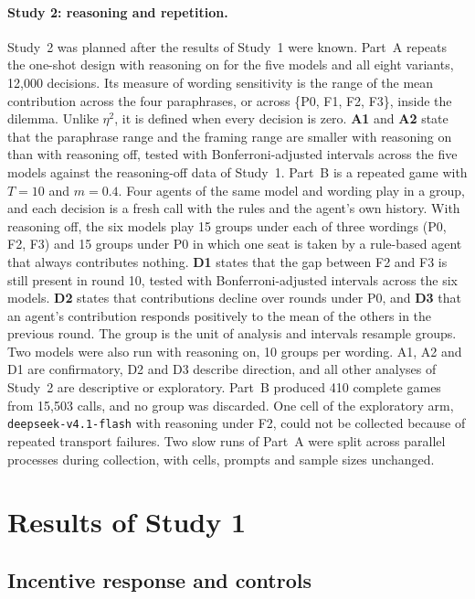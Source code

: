\documentclass[runningheads]{llncs}
\begin{document}
\paragraph{Study 2: reasoning and repetition.} Study~2 was planned after the results of Study~1 were known. Part~A repeats the one-shot design with reasoning on for the five models and all eight variants, 12,000 decisions. Its measure of wording sensitivity is the range of the mean contribution across the four paraphrases, or across \{P0, F1, F2, F3\}, inside the dilemma. Unlike $\eta^2$, it is defined when every decision is zero. \textbf{A1} and \textbf{A2} state that the paraphrase range and the framing range are smaller with reasoning on than with reasoning off, tested with Bonferroni-adjusted intervals across the five models against the reasoning-off data of Study~1. Part~B is a repeated game with $T=10$ and $m=0.4$. Four agents of the same model and wording play in a group, and each decision is a fresh call with the rules and the agent's own history. With reasoning off, the six models play 15 groups under each of three wordings (P0, F2, F3) and 15 groups under P0 in which one seat is taken by a rule-based agent that always contributes nothing. \textbf{D1} states that the gap between F2 and F3 is still present in round 10, tested with Bonferroni-adjusted intervals across the six models. \textbf{D2} states that contributions decline over rounds under P0, and \textbf{D3} that an agent's contribution responds positively to the mean of the others in the previous round. The group is the unit of analysis and intervals resample groups. Two models were also run with reasoning on, 10 groups per wording. A1, A2 and D1 are confirmatory, D2 and D3 describe direction, and all other analyses of Study~2 are descriptive or exploratory. Part~B produced 410 complete games from 15,503 calls, and no group was discarded. One cell of the exploratory arm, \texttt{deepseek-v4.1-flash} with reasoning under F2, could not be collected because of repeated transport failures. Two slow runs of Part~A were split across parallel processes during collection, with cells, prompts and sample sizes unchanged.

\section{Results of Study 1}

\subsection{Incentive response and controls}
\end{document}
